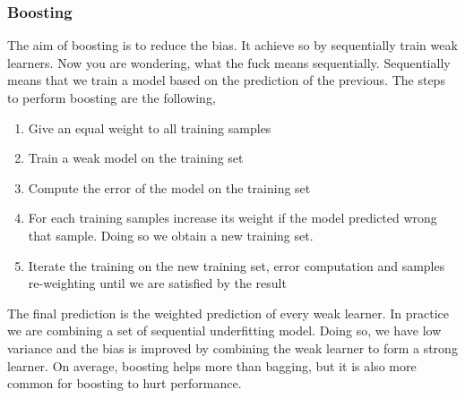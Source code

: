 \documentclass[main.tex]{subfiles}
\begin{document}
\subsubsection{Boosting}
The aim of boosting is to reduce the bias. It achieve so by sequentially train weak learners\footnotemark. Now you are wondering, what the fuck means sequentially.
Sequentially means that we train a model based on the prediction of the previous.
The steps to perform boosting are the following,
\begin{enumerate}
    \item Give an equal weight to all training samples
    \item Train a weak model on the training set
    \item Compute the error of the model on the training set
    \item For each training samples increase its weight if the model predicted wrong that sample. Doing so we obtain a new training set.
    \item Iterate the training on the new training set, error computation and samples re-weighting until we are satisfied by the result
\end{enumerate}
The final prediction is the weighted prediction of every weak learner. In practice we are combining a set of sequential underfitting model. Doing so, we have low variance and the bias is improved by combining the weak learner to form a strong learner.
On average, boosting helps more than bagging, but it is also more common for boosting to hurt performance.

\newpage
\end{document}
